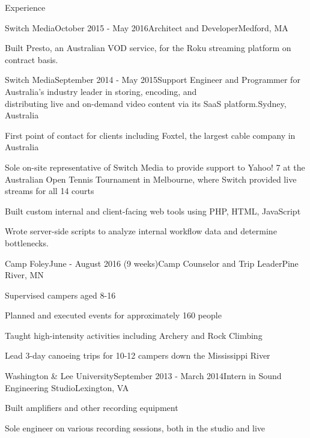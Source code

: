 \documentclass{resume}
\begin{document}
  \begin{rSection}{Experience}
  
    \begin{rSubsection}{Switch Media}{October 2015 - May 2016}{Architect and Developer}{Medford, MA}
    \item Built Presto, an Australian VOD service, for the Roku streaming platform on contract basis.
    \end{rSubsection}

    \begin{rSubsection}{Switch Media}{September 2014 - May 2015}{Support Engineer and Programmer for Australia's industry leader in storing, encoding, and\\ distributing live and on-demand video content via its SaaS platform.}{Sydney, Australia}
    \item First point of contact for clients including Foxtel, the largest cable company in Australia
    \item Sole on-site representative of Switch Media to provide support to Yahoo! 7 at the Australian Open Tennis Tournament in Melbourne, where Switch provided live streams for all 14 courts
    \item Built custom internal and client-facing web tools using PHP, HTML, JavaScript
    \item Wrote server-side scripts to analyze internal workflow data and determine bottlenecks.
    \end{rSubsection}
  
    \begin{rSubsection}{Camp Foley}{June - August 2016 (9 weeks)}{Camp Counselor and Trip Leader}{Pine River, MN}
    \item Supervised campers aged 8-16
    \item Planned and executed events for approximately 160 people
    \item Taught high-intensity activities including Archery and Rock Climbing
    \item Lead 3-day canoeing trips for 10-12 campers down the Mississippi River
    \end{rSubsection}

    \begin{rSubsection}{Washington \& Lee University}{September 2013 - March 2014}{Intern in Sound Engineering Studio}{Lexington, VA}
    \item Built amplifiers and other recording equipment
    \item Sole engineer on various recording sessions, both in the studio and live
    \end{rSubsection}
  
  \end{rSection}
  
\end{document}
